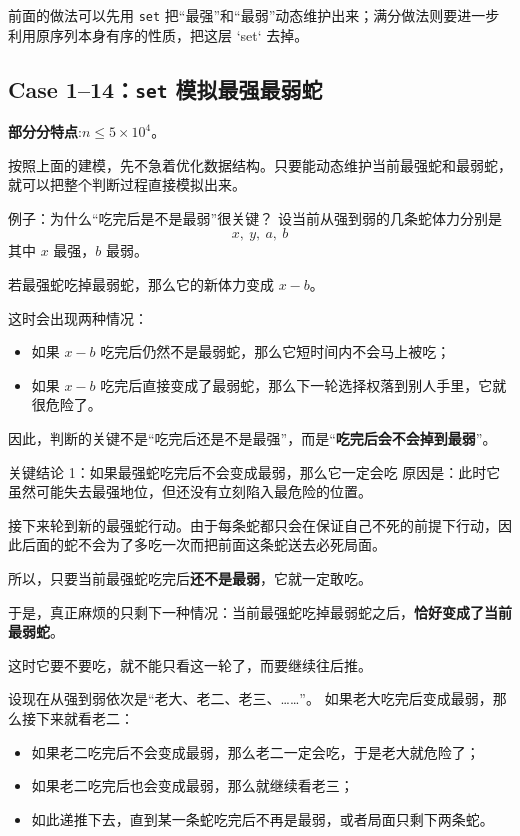 \documentclass{book}
\newcommand{\code}[1]{\colorbox{codebg}{\texttt{#1}}}  %
\begin{document}
前面的做法可以先用 \code{set} 把“最强”和“最弱”动态维护出来；满分做法则要进一步利用原序列本身有序的性质，把这层 `set` 去掉。

\subsection{Case 1--14：\code{set} 模拟最强最弱蛇}
\textbf{部分分特点}:$n \le 5 \times {10}^4$。

按照上面的建模，先不急着优化数据结构。只要能动态维护当前最强蛇和最弱蛇，就可以把整个判断过程直接模拟出来。

\begin{examplebox}{例子：为什么“吃完后是不是最弱”很关键？}
设当前从强到弱的几条蛇体力分别是
\[
x,\ y,\ a,\ b
\]
其中 $x$ 最强，$b$ 最弱。

若最强蛇吃掉最弱蛇，那么它的新体力变成 $x-b$。

这时会出现两种情况：

\begin{itemize}[leftmargin=2em,itemsep=1pt,topsep=2pt,parsep=0pt,partopsep=0pt]
    \item 如果 $x-b$ 吃完后仍然不是最弱蛇，那么它短时间内不会马上被吃；
    \item 如果 $x-b$ 吃完后直接变成了最弱蛇，那么下一轮选择权落到别人手里，它就很危险了。
\end{itemize}

因此，判断的关键不是“吃完后还是不是最强”，而是“\textbf{吃完后会不会掉到最弱}”。
\end{examplebox}

\begin{keybox}{关键结论 1：如果最强蛇吃完后不会变成最弱，那么它一定会吃}
原因是：此时它虽然可能失去最强地位，但还没有立刻陷入最危险的位置。

接下来轮到新的最强蛇行动。由于每条蛇都只会在保证自己不死的前提下行动，因此后面的蛇不会为了多吃一次而把前面这条蛇送去必死局面。

所以，只要当前最强蛇吃完后\textbf{还不是最弱}，它就一定敢吃。
\end{keybox}

于是，真正麻烦的只剩下一种情况：当前最强蛇吃掉最弱蛇之后，\textbf{恰好变成了当前最弱蛇}。

这时它要不要吃，就不能只看这一轮了，而要继续往后推。

设现在从强到弱依次是“老大、老二、老三、……”。  
如果老大吃完后变成最弱，那么接下来就看老二：

\begin{itemize}[leftmargin=2em,itemsep=1pt,topsep=2pt,parsep=0pt,partopsep=0pt]
    \item 如果老二吃完后不会变成最弱，那么老二一定会吃，于是老大就危险了；
    \item 如果老二吃完后也会变成最弱，那么就继续看老三；
    \item 如此递推下去，直到某一条蛇吃完后不再是最弱，或者局面只剩下两条蛇。
\end{itemize}
\end{document}
